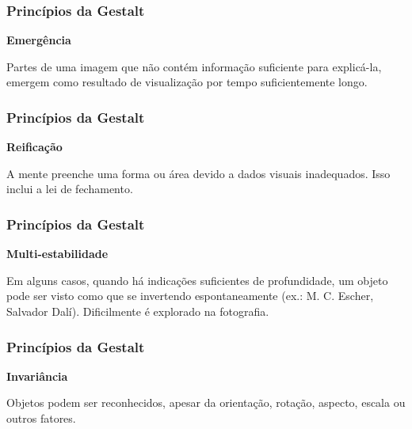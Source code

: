 \begin{frame}
    \frametitle{Princípios da Gestalt}
    {\textbf{\large Emergência}}
    \vspace{1cm}

    Partes de uma imagem que não contém informação suficiente para explicá-la,
    emergem como resultado de visualização por tempo suficientemente longo.
\end{frame}

\begin{frame}
  \frametitle{Princípios da Gestalt}
  {\textbf{\large Reificação}}
  \vspace{1cm}

  A mente preenche uma forma ou área devido a dados visuais inadequados. Isso
  inclui a lei de fechamento.
\end{frame}

\begin{frame}
  \frametitle{Princípios da Gestalt}
  {\textbf{\large Multi-estabilidade}}
  \vspace{1cm}

  Em alguns casos, quando há indicações suficientes de profundidade, um objeto
  pode ser visto como que se invertendo espontaneamente (ex.: M. C. Escher,
  Salvador Dalí). Dificilmente é explorado na fotografia.
\end{frame}

\begin{frame}
  \frametitle{Princípios da Gestalt}
  {\textbf{\large Invariância}}
  \vspace{1cm}

  Objetos podem ser reconhecidos, apesar da orientação, rotação, aspecto, escala
  ou outros fatores.
\end{frame}






